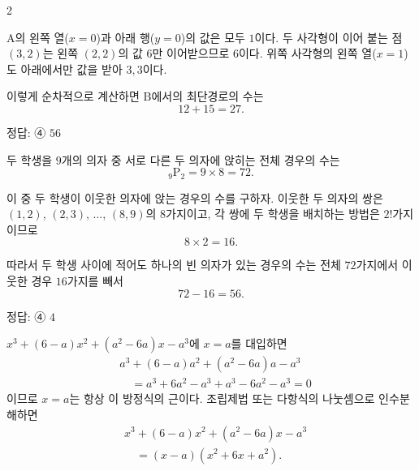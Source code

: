 \documentclass[10pt]{article}
\begin{document}
\begin{multicols}{2}
\begin{center}
\end{center}

$\mathrm{A}$의 왼쪽 열($x=0$)과 아래 행($y=0$)의 값은 모두 $1$이다. 두 사각형이 이어 붙는 점 $(3, 2)$는 왼쪽 $(2, 2)$의 값 $6$만 이어받으므로 $6$이다. 위쪽 사각형의 왼쪽 열($x=1$)도 아래에서만 값을 받아 $3, 3$이다.

이렇게 순차적으로 계산하면 $\mathrm{B}$에서의 최단경로의 수는
\[ 12 + 15 = 27. \]

\begin{answerbox}정답: ④ $56$\end{answerbox}

두 학생을 $9$개의 의자 중 서로 다른 두 의자에 앉히는 전체 경우의 수는
\[ {}_9\mathrm{P}_2 = 9 \times 8 = 72. \]

이 중 두 학생이 이웃한 의자에 앉는 경우의 수를 구하자. 이웃한 두 의자의 쌍은 $(1,2)$, $(2,3)$, $\ldots$, $(8,9)$의 $8$가지이고, 각 쌍에 두 학생을 배치하는 방법은 $2!$가지이므로
\[ 8 \times 2 = 16. \]

따라서 두 학생 사이에 적어도 하나의 빈 의자가 있는 경우의 수는 전체 $72$가지에서 이웃한 경우 $16$가지를 빼서
\[ 72 - 16 = 56. \]

\begin{answerbox}정답: ④ $4$\end{answerbox}

$x^3 + (6-a)x^2 + (a^2-6a)x - a^3$에 $x = a$를 대입하면
\begin{align*}
&a^3 + (6-a)a^2 + (a^2 - 6a)a - a^3 \\
&\quad = a^3 + 6a^2 - a^3 + a^3 - 6a^2 - a^3 = 0
\end{align*}
이므로 $x = a$는 항상 이 방정식의 근이다. 조립제법 또는 다항식의 나눗셈으로 인수분해하면
\begin{align*}
&x^3 + (6-a)x^2 + (a^2-6a)x - a^3 \\
&\quad = (x - a)(x^2 + 6x + a^2).
\end{align*}


\end{multicols}
\end{document}
